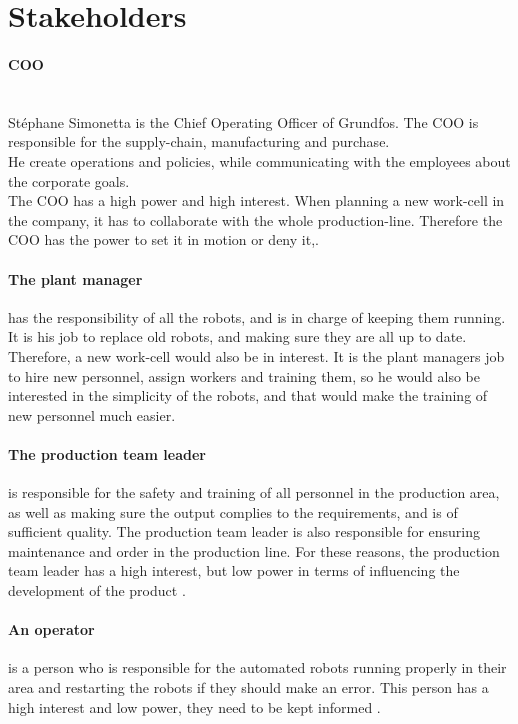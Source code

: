\section{Stakeholders}


\paragraph{COO}\label{ch:grundfosas-CEO}
\\Stéphane Simonetta is the Chief Operating Officer of Grundfos. The COO is responsible for the supply-chain, manufacturing and purchase.\\ 
He create operations and policies, while communicating with the employees about the corporate goals.\\
The COO has a high power and high interest. When planning a new work-cell in the company, it has to collaborate with the whole production-line. Therefore the COO has the power to set it in motion or deny it\cite{Grundfos},\cite{COO}.

\paragraph{The plant manager}\label{ch:Plant-manager} 
 has the responsibility of all the robots, and is in charge of keeping them running. It is his job to replace old robots, and making sure they are all up to date. Therefore, a new work-cell would also be in interest. It is the plant managers job to hire new personnel, assign workers and training them, so he would also be interested in the simplicity of the robots, and that would make the training of new personnel much easier\cite{plantmanager}.

\paragraph{The production team leader}\label{ch:Production-team-leader}
 is responsible for the safety and training of all personnel in the production area, as well as making sure the output complies to the requirements, and is of sufficient quality. The production team leader is also responsible for ensuring maintenance and order in the production line. For these reasons, the production team leader has a high interest, but low power in terms of influencing the development of the product \cite{Productionteamleader}.

\paragraph{An operator}\label{ch:grundfosemp-stake}
 is a person who is responsible for the automated robots running properly in their area and restarting the robots if they should make an error. This person has a high interest and low power, they need to be kept informed \cite{Operator}.

